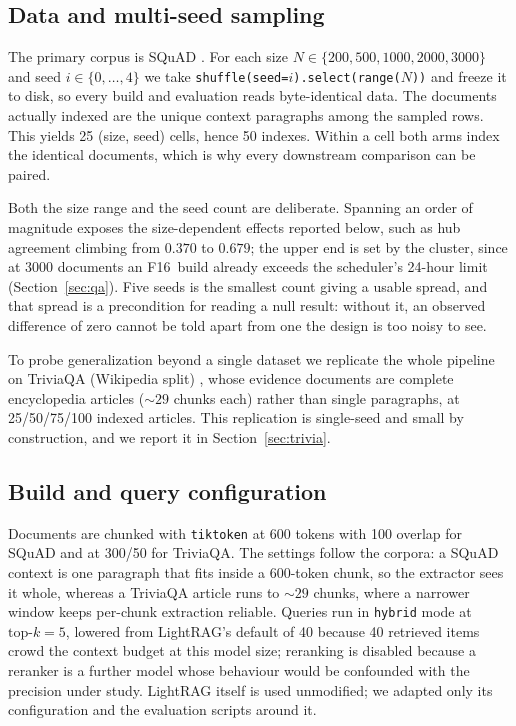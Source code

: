 \documentclass[conference, table]{IEEEtran}
\newcommand{\fsixteen}{F16}
\begin{document}
\subsection{Data and multi-seed sampling}

\noindent
The primary corpus is SQuAD \cite{squad2016}. For each size $N \in \{200, 500, 1000, 2000, 3000\}$ and seed $i \in \{0,\dots,4\}$ we take \texttt{shuffle(seed=$i$).select(range($N$))} and freeze it to disk, so every build and evaluation reads byte-identical data. The documents actually indexed are the unique context paragraphs among the sampled rows. This yields 25 (size, seed) cells, hence 50 indexes. Within a cell both arms index the identical documents, which is why every downstream comparison can be paired.

\noindent
Both the size range and the seed count are deliberate. Spanning an order of magnitude exposes the size-dependent effects reported below, such as hub agreement climbing from $0.370$ to $0.679$; the upper end is set by the cluster, since at 3000 documents an \fsixteen\ build already exceeds the scheduler's 24-hour limit (Section~\ref{sec:qa}). Five seeds is the smallest count giving a usable spread, and that spread is a precondition for reading a null result: without it, an observed difference of zero cannot be told apart from one the design is too noisy to see.

\noindent
To probe generalization beyond a single dataset we replicate the whole pipeline on TriviaQA (Wikipedia split) \cite{triviaqa2017}, whose evidence documents are complete encyclopedia articles ($\sim\!29$ chunks each) rather than single paragraphs, at 25/50/75/100 indexed articles. This replication is single-seed and small by construction, and we report it in Section~\ref{sec:trivia}.

\subsection{Build and query configuration}

\noindent
Documents are chunked with \texttt{tiktoken} \cite{tiktoken} at 600 tokens with 100 overlap for SQuAD and at 300/50 for TriviaQA. The settings follow the corpora: a SQuAD context is one paragraph that fits inside a 600-token chunk, so the extractor sees it whole, whereas a TriviaQA article runs to $\sim\!29$ chunks, where a narrower window keeps per-chunk extraction reliable. Queries run in \texttt{hybrid} mode at $\text{top-}k = 5$, lowered from LightRAG's default of 40 because 40 retrieved items crowd the context budget at this model size; reranking is disabled because a reranker is a further model whose behaviour would be confounded with the precision under study. LightRAG itself is used unmodified; we adapted only its configuration and the evaluation scripts around it.
\end{document}
